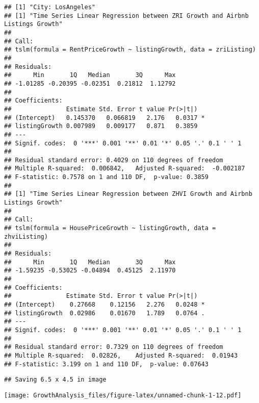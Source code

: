 \documentclass[
]{article}
\begin{document}
\begin{verbatim}
## [1] "City: LosAngeles"
## [1] "Time Series Linear Regression between ZRI Growth and Airbnb Listings Growth"
## 
## Call:
## tslm(formula = RentPriceGrowth ~ listingGrowth, data = zriListing)
## 
## Residuals:
##      Min       1Q   Median       3Q      Max 
## -1.01285 -0.20395 -0.02351  0.21812  1.12792 
## 
## Coefficients:
##               Estimate Std. Error t value Pr(>|t|)  
## (Intercept)   0.145370   0.066819   2.176   0.0317 *
## listingGrowth 0.007989   0.009177   0.871   0.3859  
## ---
## Signif. codes:  0 '***' 0.001 '**' 0.01 '*' 0.05 '.' 0.1 ' ' 1
## 
## Residual standard error: 0.4029 on 110 degrees of freedom
## Multiple R-squared:  0.006842,   Adjusted R-squared:  -0.002187 
## F-statistic: 0.7578 on 1 and 110 DF,  p-value: 0.3859
## 
## [1] "Time Series Linear Regression between ZHVI Growth and Airbnb Listings Growth"
## 
## Call:
## tslm(formula = HousePriceGrowth ~ listingGrowth, data = zhviListing)
## 
## Residuals:
##      Min       1Q   Median       3Q      Max 
## -1.59235 -0.53025 -0.04894  0.45125  2.11970 
## 
## Coefficients:
##               Estimate Std. Error t value Pr(>|t|)  
## (Intercept)    0.27668    0.12156   2.276   0.0248 *
## listingGrowth  0.02986    0.01670   1.789   0.0764 .
## ---
## Signif. codes:  0 '***' 0.001 '**' 0.01 '*' 0.05 '.' 0.1 ' ' 1
## 
## Residual standard error: 0.7329 on 110 degrees of freedom
## Multiple R-squared:  0.02826,    Adjusted R-squared:  0.01943 
## F-statistic: 3.199 on 1 and 110 DF,  p-value: 0.07643
\end{verbatim}

\begin{verbatim}
## Saving 6.5 x 4.5 in image
\end{verbatim}

\texttt{[image: GrowthAnalysis\_files/figure-latex/unnamed-chunk-1-12.pdf]}
\end{document}
